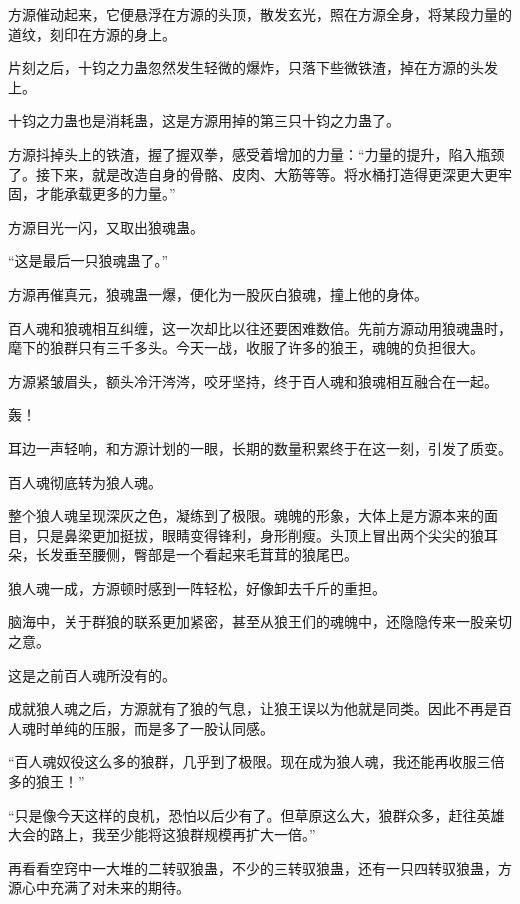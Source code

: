 \begin{this_body}
方源催动起来，它便悬浮在方源的头顶，散发玄光，照在方源全身，将某段力量的道纹，刻印在方源的身上。

片刻之后，十钧之力蛊忽然发生轻微的爆炸，只落下些微铁渣，掉在方源的头发上。

十钧之力蛊也是消耗蛊，这是方源用掉的第三只十钧之力蛊了。

方源抖掉头上的铁渣，握了握双拳，感受着增加的力量：“力量的提升，陷入瓶颈了。接下来，就是改造自身的骨骼、皮肉、大筋等等。将水桶打造得更深更大更牢固，才能承载更多的力量。”

方源目光一闪，又取出狼魂蛊。

“这是最后一只狼魂蛊了。”

方源再催真元，狼魂蛊一爆，便化为一股灰白狼魂，撞上他的身体。

百人魂和狼魂相互纠缠，这一次却比以往还要困难数倍。先前方源动用狼魂蛊时，麾下的狼群只有三千多头。今天一战，收服了许多的狼王，魂魄的负担很大。

方源紧皱眉头，额头冷汗涔涔，咬牙坚持，终于百人魂和狼魂相互融合在一起。

轰！

耳边一声轻响，和方源计划的一眼，长期的数量积累终于在这一刻，引发了质变。

百人魂彻底转为狼人魂。

整个狼人魂呈现深灰之色，凝练到了极限。魂魄的形象，大体上是方源本来的面目，只是鼻梁更加挺拔，眼睛变得锋利，身形削瘦。头顶上冒出两个尖尖的狼耳朵，长发垂至腰侧，臀部是一个看起来毛茸茸的狼尾巴。

狼人魂一成，方源顿时感到一阵轻松，好像卸去千斤的重担。

脑海中，关于群狼的联系更加紧密，甚至从狼王们的魂魄中，还隐隐传来一股亲切之意。

这是之前百人魂所没有的。

成就狼人魂之后，方源就有了狼的气息，让狼王误以为他就是同类。因此不再是百人魂时单纯的压服，而是多了一股认同感。

“百人魂奴役这么多的狼群，几乎到了极限。现在成为狼人魂，我还能再收服三倍多的狼王！”

“只是像今天这样的良机，恐怕以后少有了。但草原这么大，狼群众多，赶往英雄大会的路上，我至少能将这狼群规模再扩大一倍。”

再看看空窍中一大堆的二转驭狼蛊，不少的三转驭狼蛊，还有一只四转驭狼蛊，方源心中充满了对未来的期待。

\end{this_body}

